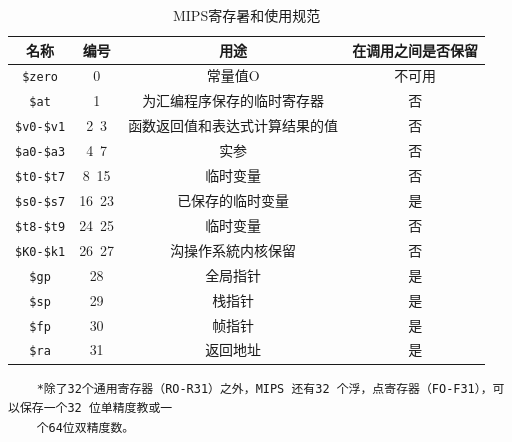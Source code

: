 \begin{table}[]
    \centering
    \caption{MIPS寄存暑和使用规范}
    \begin{tabular}{|c|c|c|c|}
    \hline
    名称             & 编号  & 用途         & 在调用之间是否保留 \\ \hline
    \verb|$zero|    & 0     & 常量值O                   & 不可用 \\ \hline
    \verb|$at|      & 1     & 为汇编程序保存的临时寄存器    & 否 \\ \hline
    \verb|$v0-$v1|  & 2~3   & 函数返回值和表达式计算结果的值 & 否 \\ \hline
    \verb|$a0-$a3|  & 4~7   & 实参                      & 否 \\ \hline
    \verb|$t0-$t7|  & 8~15  & 临时变量                   & 否 \\ \hline
    \verb|$s0-$s7|  & 16~23 & 已保存的临时变量            & 是 \\ \hline
    \verb|$t8-$t9|  & 24~25 & 临时变量                   & 否 \\ \hline
    \verb|$K0-$k1|  & 26~27 & 沟操作系統内核保留          & 否 \\ \hline
    \verb|$gp|      & 28    & 全局指针                  & 是 \\ \hline
    \verb|$sp|      & 29    & 栈指针                    & 是 \\ \hline
    \verb|$fp|      & 30    & 帧指针                    & 是 \\ \hline
    \verb|$ra|      & 31    & 返回地址                  & 是 \\ \hline
    \end{tabular}
\end{table}
\begin{verbatim}
    *除了32个通用寄存器（RO-R31）之外，MIPS 还有32 个浮，点寄存器（FO-F31），可以保存一个32 位单精度教或一
    个64位双精度数。
\end{verbatim}

